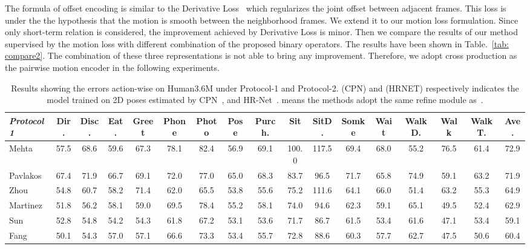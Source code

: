 \documentclass[runningheads]{llncs}
\begin{document}
The formula of offset encoding is similar to the Derivative Loss~\cite{rayat2018exploiting}
which regularizes the joint offset between adjacent frames.
This loss is under the the hypothesis that the motion is smooth between the neighborhood frames.
We extend it to our motion loss formulation.
Since only short-term relation is considered, the improvement achieved by Derivative Loss is minor.
Then we compare the results of our method supervised by the motion loss with different combination of the proposed binary operators.
The results have been shown in Table.~\ref{tab: compare2}.
The combination of these three representations is not able to bring any improvement.
Therefore, we adopt cross production as the pairwise motion encoder in the following experiments.
\begin{table}[t]
    \tiny
    \setlength{\tabcolsep}{0.15em}
    \centering
    \caption {
        Results showing the errors action-wise on Human3.6M under Protocol-1 and Protocol-2.
        (CPN) and (HRNET) respectively indicates the model trained on 2D poses estimated by CPN~\cite{chen2018cascaded},
        and HR-Net~\cite{Sun_2019_CVPR}.  means the methods adopt the same refine module as~\cite{cai2019exploiting}.
        }
    \label{tab: h35m sota}
    \begin{tabular}[width=0.9\linewidth]{@{}l| ccccccccccccccc |c   @{}}
    \toprule
    \textbf{\emph{Protocol 1}} & Dir. & Disc. & Eat. & Greet   & Phone & Photo & Pose & Purch. & Sit   & SitD. & Somke & Wait & WalkD.  & Walk & WalkT. & Ave. \\
    \midrule
    Mehta~\cite{mehta2017monocular} &57.5 & 68.6 &59.6 &67.3 &78.1& 82.4 &56.9& 69.1& 100.0& 117.5& 69.4& 68.0& 55.2 &76.5& 61.4& 72.9 \\
    Pavlakos~\cite{pavlakos2017coarse} & 67.4& 71.9& 66.7& 69.1& 72.0& 77.0& 65.0& 68.3& 83.7& 96.5& 71.7& 65.8& 74.9& 59.1& 63.2& 71.9 \\
    Zhou~\cite{zhou2017towards} & 54.8& 60.7& 58.2& 71.4& 62.0& 65.5& 53.8& 55.6& 75.2& 111.6& 64.1& 66.0& 51.4& 63.2& 55.3& 64.9 \\
    Martinez~\cite{martinez2017simple}& 51.8& 56.2& 58.1& 59.0& 69.5& 78.4& 55.2& 58.1& 74.0& 94.6& 62.3& 59.1& 65.1& 49.5& 52.4& 62.9\\
    Sun~\cite{sun2017compositional} & 52.8& 54.8& 54.2& 54.3& 61.8& 67.2& 53.1& 53.6& 71.7& 86.7& 61.5& 53.4& 61.6& 47.1& 53.4& 59.1 \\
    Fang~\cite{fang2018learning} & 50.1& 54.3& 57.0& 57.1& 66.6& 73.3& 53.4& 55.7& 72.8& 88.6& 60.3& 57.7& 62.7& 47.5& 50.6& 60.4 \\

\end{tabular}
\end{table}
\end{document}
